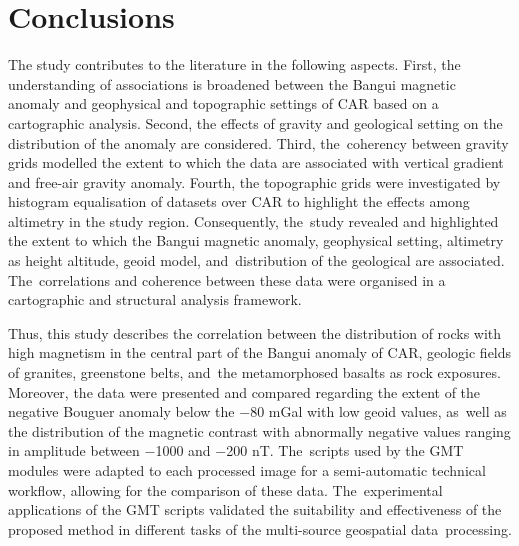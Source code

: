 \documentclass[minerals,article,accept,pdftex,moreauthors]{Definitions/mdpi}
\begin{document}
\section{Conclusions}

{The study contributes to the literature in the following aspects. First, the understanding of associations is broadened between the Bangui magnetic anomaly and geophysical and topographic settings of CAR based on a cartographic analysis. Second, the effects of gravity and geological setting on the distribution of the anomaly are considered. Third, the~coherency between gravity grids modelled the extent to which the data are associated with vertical gradient and free-air gravity anomaly. Fourth, the topographic grids were investigated by histogram equalisation of datasets over CAR to highlight the effects among altimetry in the study region. Consequently, the~study revealed and highlighted the extent to which the Bangui magnetic anomaly, geophysical setting, altimetry as height altitude, geoid model, and~distribution of the geological are associated. The~correlations and coherence between these data were organised in a cartographic and structural analysis framework. }

{Thus, this} study describes the correlation between the distribution of rocks with high magnetism in the central part of the Bangui anomaly of CAR, geologic fields of granites, greenstone belts, and~the metamorphosed basalts as rock exposures. Moreover, the data were presented and compared regarding the extent of the negative Bouguer anomaly below the $-$80 mGal with low geoid values, as~well as the distribution of the magnetic contrast with abnormally negative values ranging in amplitude between $-$1000 and $-$200 nT. The~scripts used by the GMT modules were adapted to each processed image for a semi-automatic technical workflow, allowing for the comparison of these data. The~experimental applications of the GMT scripts validated the suitability and effectiveness of the proposed method in different tasks of the multi-source geospatial data~processing.  
\end{document}
